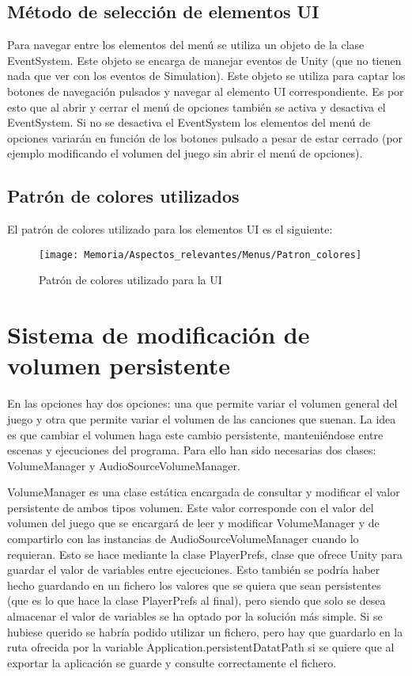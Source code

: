 \subsection{Método de selección de elementos UI}
Para navegar entre los elementos del menú se utiliza un objeto de la clase EventSystem. Este objeto se encarga de manejar eventos de Unity (que no tienen nada que ver con los eventos de Simulation). Este objeto se utiliza para captar los botones de navegación pulsados y navegar al elemento UI correspondiente. Es por esto que al abrir y cerrar el menú de opciones también se activa y desactiva el EventSystem. Si no se desactiva el EventSystem los elementos del menú de opciones variarán en función de los botones pulsado a pesar de estar cerrado (por ejemplo modificando el volumen del juego sin abrir el menú de opciones). 

\subsection{Patrón de colores utilizados}
El patrón de colores utilizado para los elementos UI es el siguiente:

\clearpage
\begin{figure}[h]
\texttt{[image: Memoria/Aspectos\_relevantes/Menus/Patron\_colores]}
\caption{Patrón de colores utilizado para la UI}
\end{figure}

\section{Sistema de modificación de volumen persistente}
En las opciones hay dos opciones: una que permite variar el volumen general del juego y otra que permite variar el volumen de las canciones que suenan. La idea es que cambiar el volumen haga este cambio persistente, manteniéndose entre escenas y ejecuciones del programa. Para ello han sido necesarias dos clases: VolumeManager y AudioSourceVolumeManager.

VolumeManager es una clase estática encargada de consultar y modificar el valor persistente de ambos tipos volumen. Este valor corresponde con el valor del volumen del juego que se encargará de leer y modificar VolumeManager y de compartirlo con las instancias de AudioSourceVolumeManager cuando lo requieran. Esto se hace mediante la clase PlayerPrefs, clase que ofrece Unity para guardar el valor de variables entre ejecuciones. Esto también se podría haber hecho guardando en un fichero los valores que se quiera que sean persistentes (que es lo que hace la clase PlayerPrefs al final), pero siendo que solo se desea almacenar el valor de variables se ha optado por la solución más simple. Si se hubiese querido se habría podido utilizar un fichero, pero hay que guardarlo en la ruta ofrecida por la variable Application.persistentDatatPath si se quiere que al exportar la aplicación se guarde y consulte correctamente el fichero.

